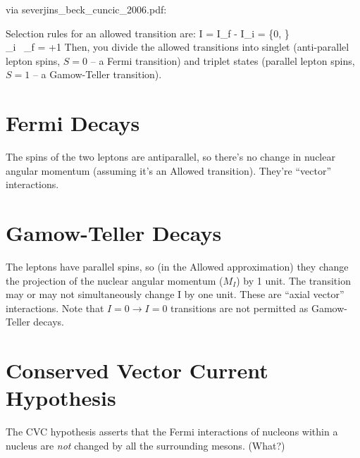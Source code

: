 via severjins\_beck\_cuncic\_2006.pdf:

Selection rules for an allowed transition are:
\bea
\Delta I = I_f - I_i = \{0, \} \\ 
\hat{\Pi}_i \, \hat{\Pi}_f = +1
\eea
Then, you divide the allowed transitions into singlet (anti-parallel lepton spins, $S=0$ -- a Fermi transition) and triplet states (parallel lepton spins, $S=1$ -- a Gamow-Teller transition).

\section{Fermi Decays}
The spins of the two leptons are antiparallel, so there's no change in nuclear angular momentum (assuming it's  an Allowed transition).  They're ``vector'' interactions.

\section{Gamow-Teller Decays}
The leptons have parallel spins, so (in the Allowed approximation) they change the projection of the nuclear angular momentum ($M_I$) by 1 unit.  The transition may or may not simultaneously change I by one unit.  These are ``axial vector'' interactions.  Note that $I=0 \rightarrow I=0$ transitions are not permitted as Gamow-Teller decays.

\section{Conserved Vector Current Hypothesis}
The CVC hypothesis asserts that the Fermi interactions of nucleons within a nucleus are \emph{not} changed by all the surrounding mesons.  (What?)



